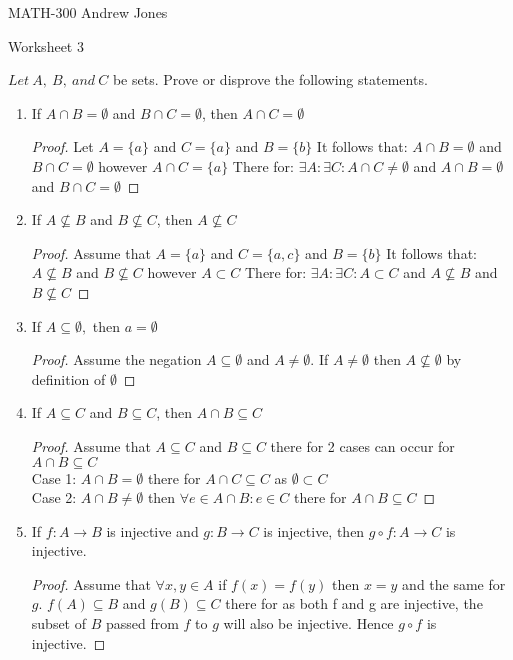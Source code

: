 \documentclass{article}
\begin{document}
  MATH-300 \hfill Andrew Jones
  \begin{center}
  {\huge Worksheet 3}
  \end{center}
  $Let\ A,\ B,\ and\ C$ be sets. Prove or disprove the following statements. \\
  \begin{enumerate}
  \item If $A\cap B = \emptyset$ and $B\cap C = \emptyset$, then $A\cap C = \emptyset$
    \begin{proof}
      Let $A = \{a\}$ and $C = \{a\}$ and $B = \{b\}$ 
      It follows that: $A\cap B = \emptyset$ and $B\cap C = \emptyset$ however $A\cap C = \{a\}$
      There for: $\exists A: \exists C: A\cap C \neq \emptyset$ and $A\cap B = \emptyset$ and $B\cap C = \emptyset$  
    \end{proof}
  \item If $A\not\subseteq B$ and $B\not\subseteq C$, then $A\not\subseteq C$ 
    \begin{proof}
      Assume that $A = \{a\}$ and $C = \{a, c\}$ and $B = \{b\}$ 
      It follows that: $A\not\subseteq B$ and $B\not\subseteq C$ however $A\subset C$
      There for: $\exists A: \exists C: A\subset C$ and $A\not\subseteq B$ and $B\not\subseteq C$  
    \end{proof}
  \item If $A\subseteq \emptyset,$ then $a= \emptyset$ 
    \begin{proof}
      Assume the negation $A\subseteq \emptyset$ and $A \neq \emptyset$.
      If $A \neq \emptyset$ then $A\not\subseteq \emptyset$ by definition of $\emptyset$ 
    \end{proof}
  \item If $A\subseteq C$ and $B\subseteq C$, then $A\cap B\subseteq C$
    \begin{proof}
     Assume that $A\subseteq C$ and $B\subseteq C$ there for 2 cases can occur for $A\cap B\subseteq C$ \\
     Case 1: $A\cap B = \emptyset$ there for $A\cap C\subseteq C$ as $\emptyset \subset C$ \\
     Case 2: $A\cap B \neq \emptyset$ then $\forall e\in A\cap B: e\in C$ there for $A\cap B \subseteq C$
    \end{proof}
  \item If $f : A\to B$ is injective and $g : B\to C$ is injective, then $g \circ f : A\to C$ is injective. 
    \begin{proof}
      Assume that $\forall x,y\in A$ if $f(x) = f(y)$ then $x = y$ and the same for $g$. $f(A) \subseteq B$ and $g(B) \subseteq C$ there for as both f and g are injective, the subset of $B$ passed from $f$ to $g$ will also be injective. Hence $g \circ f$ is injective.

\end{proof}
\end{enumerate}
\end{document}

